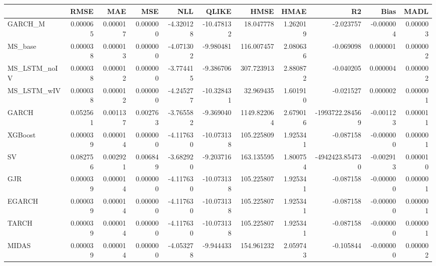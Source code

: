 \begin{tabular}{lrrrrrrrrrr}
\toprule
 & RMSE & MAE & MSE & NLL & QLIKE & HMSE & HMAE & R2 & Bias & MADL \\
\midrule
GARCH_M & 0.000065 & 0.000017 & 0.000000 & -4.320128 & -10.478132 & 18.047778 & 1.262019 & -2.023757 & -0.000004 & 0.000003 \\
MS_base & 0.000038 & 0.000013 & 0.000000 & -4.071302 & -9.980481 & 116.007457 & 2.080636 & -0.069098 & 0.000001 & 0.000002 \\
MS_LSTM_noIV & 0.000038 & 0.000012 & 0.000000 & -3.774415 & -9.386706 & 307.723913 & 2.880872 & -0.040205 & 0.000004 & 0.000002 \\
MS_LSTM_wIV & 0.000038 & 0.000012 & 0.000000 & -4.245277 & -10.328431 & 32.969435 & 1.601910 & -0.021527 & 0.000002 & 0.000001 \\
GARCH & 0.052561 & 0.001137 & 0.002763 & -3.765582 & -9.369040 & 1149.822064 & 2.679016 & -1993722.284569 & -0.001123 & 0.000011 \\
XGBoost & 0.000039 & 0.000014 & 0.000000 & -4.117630 & -10.073138 & 105.225809 & 1.925341 & -0.087158 & -0.000000 & 0.000001 \\
SV & 0.082756 & 0.002921 & 0.006849 & -3.682920 & -9.203716 & 163.135595 & 1.800754 & -4942423.854730 & -0.002913 & 0.000010 \\
GJR & 0.000039 & 0.000014 & 0.000000 & -4.117630 & -10.073138 & 105.225807 & 1.925341 & -0.087158 & -0.000000 & 0.000001 \\
EGARCH & 0.000039 & 0.000014 & 0.000000 & -4.117630 & -10.073138 & 105.225807 & 1.925341 & -0.087158 & -0.000000 & 0.000001 \\
TARCH & 0.000039 & 0.000014 & 0.000000 & -4.117630 & -10.073138 & 105.225807 & 1.925341 & -0.087158 & -0.000000 & 0.000001 \\
MIDAS & 0.000039 & 0.000014 & 0.000000 & -4.053278 & -9.944433 & 154.961232 & 2.059743 & -0.105844 & -0.000000 & 0.000002 \\
\bottomrule
\end{tabular}
